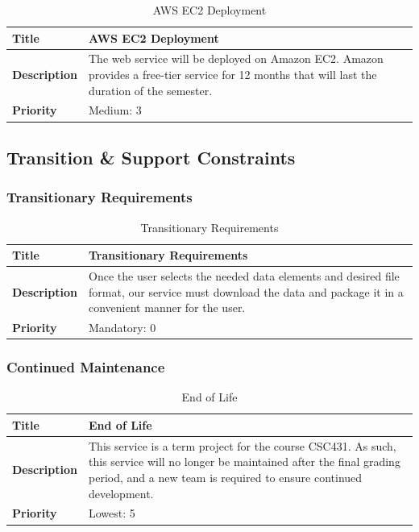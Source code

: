 \documentclass{article}
\begin{document}
\begin{table}[H]
	\caption{AWS EC2 Deployment}
	\begin{tabularx}{\textwidth}{|l|X|}
		\hline
		\textbf{Title}       & AWS EC2 Deployment                              \\ \hline
		\textbf{Description} & The web service will be deployed on Amazon EC2.
		Amazon provides a free-tier service for 12 months that will last the
		duration of the semester.        \\ \hline
		\textbf{Priority}    & Medium: 3                                       \\ \hline
	\end{tabularx}
\end{table}

\subsection{Transition \& Support Constraints}

\subsubsection{Transitionary Requirements}

\begin{table}[H]
	\caption{Transitionary Requirements}
	\begin{tabularx}{\textwidth}{|l|X|}
		\hline
		\textbf{Title}       & Transitionary Requirements             \\ \hline
		\textbf{Description} & Once the user selects the needed data elements and desired file format, our service must download the data and package it in a convenient manner for the user.      \\ \hline
		\textbf{Priority}    & Mandatory: 0 \\ \hline
	\end{tabularx}
\end{table}

\subsubsection{Continued Maintenance}

\begin{table}[H]
	\caption{End of Life}
	\begin{tabularx}{\textwidth}{|l|X|}
		\hline
		\textbf{Title}       & End of Life            \\ \hline
		\textbf{Description} & This service is a term project for the course CSC431. As such, this service will no longer be maintained after the final grading period, and a new team is required to ensure continued development. \\ \hline
		\textbf{Priority}    & Lowest: 5 \\ \hline
	\end{tabularx}
\end{table}
\end{document}
